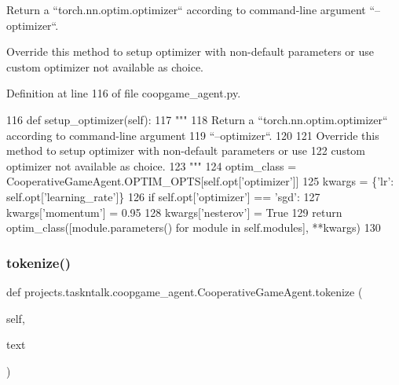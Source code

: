 \begin{DoxyVerb}Return a ``torch.nn.optim.optimizer`` according to command-line argument
``--optimizer``.

Override this method to setup optimizer with non-default parameters or use
custom optimizer not available as choice.
\end{DoxyVerb}
 

Definition at line 116 of file coopgame\+\_\+agent.\+py.


\begin{DoxyCode}
116     \textcolor{keyword}{def }setup\_optimizer(self):
117         \textcolor{stringliteral}{"""}
118 \textcolor{stringliteral}{        Return a ``torch.nn.optim.optimizer`` according to command-line argument}
119 \textcolor{stringliteral}{        ``--optimizer``.}
120 \textcolor{stringliteral}{}
121 \textcolor{stringliteral}{        Override this method to setup optimizer with non-default parameters or use}
122 \textcolor{stringliteral}{        custom optimizer not available as choice.}
123 \textcolor{stringliteral}{        """}
124         optim\_class = CooperativeGameAgent.OPTIM\_OPTS[self.opt[\textcolor{stringliteral}{'optimizer'}]]
125         kwargs = \{\textcolor{stringliteral}{'lr'}: self.opt[\textcolor{stringliteral}{'learning\_rate'}]\}
126         \textcolor{keywordflow}{if} self.opt[\textcolor{stringliteral}{'optimizer'}] == \textcolor{stringliteral}{'sgd'}:
127             kwargs[\textcolor{stringliteral}{'momentum'}] = 0.95
128             kwargs[\textcolor{stringliteral}{'nesterov'}] = \textcolor{keyword}{True}
129         \textcolor{keywordflow}{return} optim\_class([module.parameters() \textcolor{keywordflow}{for} module \textcolor{keywordflow}{in} self.modules], **kwargs)
130 
\end{DoxyCode}
\mbox{\label{classprojects_1_1taskntalk_1_1coopgame__agent_1_1CooperativeGameAgent_ad61f88467c3cef93c85292b733a5ec91}} 
\subsubsection{\texorpdfstring{tokenize()}{tokenize()}}
{\footnotesize\ttfamily def projects.\+taskntalk.\+coopgame\+\_\+agent.\+Cooperative\+Game\+Agent.\+tokenize (\begin{DoxyParamCaption}\item[{}]{self,  }\item[{}]{text }\end{DoxyParamCaption})}

